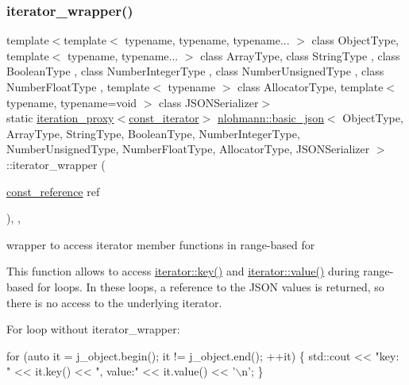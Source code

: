 \subsubsection{\texorpdfstring{iterator\+\_\+wrapper()}{iterator\_wrapper()}\hspace{0.1cm}{\footnotesize\ttfamily [2/2]}}
{\footnotesize\ttfamily template$<$template$<$ typename, typename, typename... $>$ class Object\+Type, template$<$ typename, typename... $>$ class Array\+Type, class String\+Type , class Boolean\+Type , class Number\+Integer\+Type , class Number\+Unsigned\+Type , class Number\+Float\+Type , template$<$ typename $>$ class Allocator\+Type, template$<$ typename, typename=void $>$ class J\+S\+O\+N\+Serializer$>$ \\
static \hyperlink{classnlohmann_1_1basic__json_afb49d897bc58d6678f4471925bbfbb01}{iteration\+\_\+proxy}$<$\hyperlink{classnlohmann_1_1basic__json_a41a70cf9993951836d129bb1c2b3126a}{const\+\_\+iterator}$>$ \hyperlink{classnlohmann_1_1basic__json}{nlohmann\+::basic\+\_\+json}$<$ Object\+Type, Array\+Type, String\+Type, Boolean\+Type, Number\+Integer\+Type, Number\+Unsigned\+Type, Number\+Float\+Type, Allocator\+Type, J\+S\+O\+N\+Serializer $>$\+::iterator\+\_\+wrapper (\begin{DoxyParamCaption}\item[{\hyperlink{classnlohmann_1_1basic__json_a4057c5425f4faacfe39a8046871786ca}{const\+\_\+reference}}]{ref }\end{DoxyParamCaption})\hspace{0.3cm}{\ttfamily [inline]}, {\ttfamily [static]}, {\ttfamily [noexcept]}}



wrapper to access iterator member functions in range-\/based for 

This function allows to access \hyperlink{classnlohmann_1_1detail_1_1iter__impl_a3a541a223320f6635f2f188ba54f8818}{iterator\+::key()} and \hyperlink{classnlohmann_1_1detail_1_1iter__impl_ab447c50354c6611fa2ae0100ac17845c}{iterator\+::value()} during range-\/based for loops. In these loops, a reference to the J\+S\+ON values is returned, so there is no access to the underlying iterator.

For loop without iterator\+\_\+wrapper\+:


\begin{DoxyCode}
\textcolor{keywordflow}{for} (\textcolor{keyword}{auto} it = j\_object.begin(); it != j\_object.end(); ++it)
\{
    std::cout << \textcolor{stringliteral}{"key: "} << it.key() << \textcolor{stringliteral}{", value:"} << it.value() << \textcolor{charliteral}{'\(\backslash\)n'};
\}
\end{DoxyCode}


